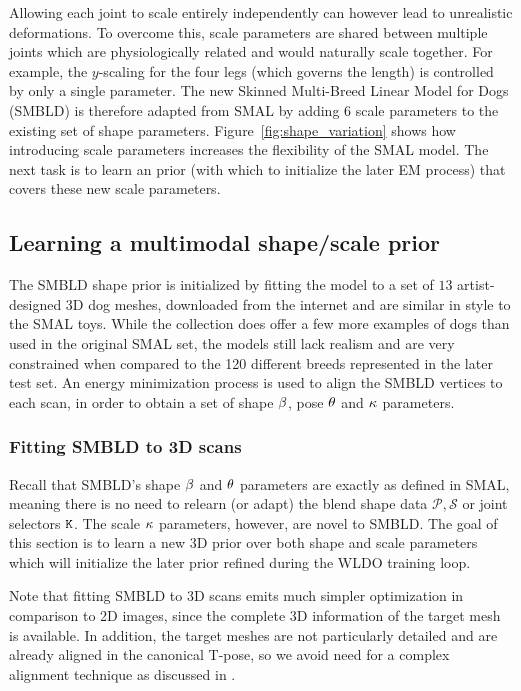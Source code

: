 Allowing each joint to scale entirely independently can however lead to unrealistic deformations. To overcome this, scale parameters are shared between multiple joints which are physiologically related and would naturally scale together. For example, the $y$-scaling for the four legs (which governs the length) is controlled by only a single parameter. The new Skinned Multi-Breed Linear Model for Dogs (SMBLD) is therefore adapted from SMAL by adding $6$ scale parameters to the existing set of shape parameters. Figure~\ref{fig:shape_variation} shows how introducing scale parameters increases the flexibility of the SMAL model. The next task is to learn an prior (with which to initialize the later EM process) that covers these new scale parameters. 



\subsection{Learning a multimodal shape/scale prior}

The SMBLD shape prior is initialized by fitting the model to a set of $13$ artist-designed 3D dog meshes, downloaded from the internet and are similar in style to the SMAL toys. While the collection does offer a few more examples of dogs than used in the original SMAL set, the models still lack realism and are very constrained when compared to the 120 different breeds represented in the later test set. An energy minimization process is used to align the SMBLD vertices to each scan, in order to obtain a set of shape $\beta$, pose $\theta$ and $\kappa$ parameters. 

\subsubsection{Fitting SMBLD to 3D scans}

Recall that SMBLD's shape $\beta$ and $\theta$ parameters are exactly as defined in SMAL, meaning there is no need to relearn (or adapt) the blend shape data $\mathcal{P}, \mathcal{S}$ or joint selectors $\mathtt{K}$. The scale $\kappa$ parameters, however, are novel to SMBLD. The goal of this section is to learn a new 3D prior over both shape and scale parameters which will initialize the later prior refined during the WLDO training loop. 

Note that fitting SMBLD to 3D scans emits much simpler optimization in comparison to 2D images, since the complete 3D information of the target mesh is available. In addition, the target meshes are not particularly detailed and are already aligned in the canonical T-pose, so we avoid need for a complex alignment technique as discussed in . 

